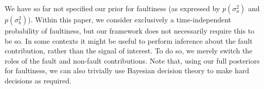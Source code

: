 \documentclass{article} %
\newcommand{\psff}[1]{\texttt{[image: \#1.eps]}}
\begin{document}
We have so far not specified our prior for faultiness (as expressed by
$p(\sigma_a^2)$ and $p(\sigma_b^2)$). Within this paper, we consider
exclusively a time-independent probability of faultiness, but our framework does not necessarily require this to be so. In some contexts it might be useful to perform inference about the
fault contribution, rather than the signal of interest.  To do so, we merely switch the roles of the fault and non-fault
contributions. Note that, using our full posteriors for faultiness, we
can also trivially use Bayesian decision theory to make hard decisions
as required.

\end{document}
